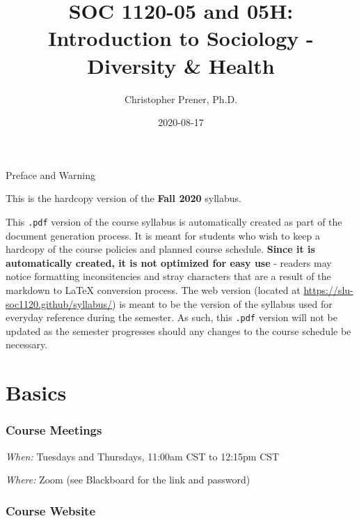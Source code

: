 \documentclass[
]{book}
\title{SOC 1120-05 and 05H: Introduction to Sociology - Diversity \& Health}
\author{Christopher Prener, Ph.D.}
\date{2020-08-17}
\begin{document}
\maketitle

\begin{center}
{\huge Preface and Warning} \\
\end{center}
\vspace{5mm}
This is the hardcopy version of the \textbf{Fall 2020} syllabus.
\vspace{5mm}
\par \noindent This \texttt{.pdf} version of the course syllabus is automatically created as part of the document generation process. It is meant for students who wish to keep a hardcopy of the course policies and planned course schedule. \textbf{Since it is automatically created, it is not optimized for easy use} - readers may notice formatting inconsitencies and stray characters that are a result of the markdown to \LaTeX{} conversion process. The web version (located at \href{https://slu-soc1120.github/syllabus/}{https://slu-soc1120.github/syllabus/}) is meant to be the version of the syllabus used for everyday reference during the semester. As such, this \texttt{.pdf} version will not be updated as the semester progresses should any changes to the course schedule be necessary.

\hypertarget{basics}{%
\chapter*{Basics}\label{basics}}

\hypertarget{course-meetings}{%
\subsection*{Course Meetings}\label{course-meetings}}

\emph{When:} Tuesdays and Thursdays, 11:00am CST to 12:15pm CST

\emph{Where:} Zoom (see Blackboard for the link and password)

\hypertarget{course-website}{%
\subsection*{Course Website}\label{course-website}}
\end{document}
